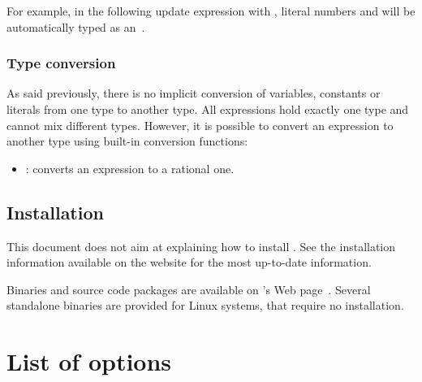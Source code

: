 For example, in the following update expression  with , literal numbers  and  will be automatically typed as an~.

\subsection{Type conversion}

As said previously, there is no implicit conversion of variables, constants or literals from one type to another type. All expressions hold exactly one type and cannot mix different types. However, it is possible to convert an expression to another type using built-in conversion functions:

\begin{itemize}
	\item {}: converts an  expression to a rational one.
\end{itemize}



\section{Installation}

This document does not aim at explaining how to install \imitator{}.
See the installation information available on the website for the most up-to-date information.

Binaries and source code packages are available on \imitator{}'s Web page~\cite{imitator}.
Several standalone binaries are provided for Linux systems, that require no installation.








\chapter{List of options}\label{chapter:options}


